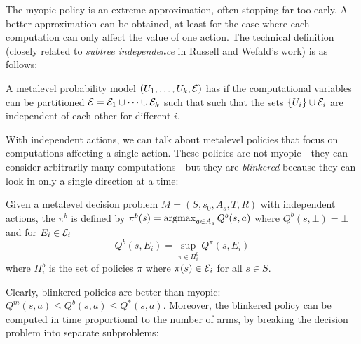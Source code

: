 


The myopic policy is an extreme approximation, often stopping far too early.
A better approximation can be obtained, at least for the case where
each computation can only affect the value of one action.
The technical definition (closely related to {\em subtree independence} in 
Russell and Wefald's work) is as follows:

\begin{dfn}\label{dfn:independent-actions}
	A metalevel probability model $(U_1,\dots,U_k,\mathcal{E})$ 
	has  if the computational variables can be partitioned 
	$\mathcal{E} = \mathcal{E}_1\cup\dots\cup\mathcal{E}_k$ such that such that
	the sets $\{U_i\}\cup\mathcal{E}_i$ are independent of each other for different $i$.	
\end{dfn}

With independent actions, we can talk about metalevel policies that focus on
computations affecting a single action. These policies are not myopic---they can consider arbitrarily many computations---but they are {\em blinkered} because they can look
in only a single direction at a time:

\begin{dfn}\label{dfn:blinkered}
	Given a metalevel decision problem $M=(S,s_0,A_s,T,R)$ with independent actions,
	the  $\pi^b$ is defined by $\pi^b(s) = \operatorname*{argmax}_{a\in A_s} Q^b(s,a)$ where
	$Q^b(s,\bot) = \bot$ and for $E_i\in\mathcal{E}_i$
	\begin{equation}\label{eq:blinkered}
		Q^b(s,E_i) = \sup_{\pi\in\Pi^b_i} Q^\pi(s,E_i)
	\end{equation}
	where $\Pi^b_i$ is the set of policies $\pi$ where $\pi(s)\in\mathcal{E}_i$ for all $s\in S$.
\end{dfn}

Clearly, blinkered policies are better than myopic: $Q^m(s,a) \le Q^b(s,a) \le Q^*(s,a)$.
Moreover, the blinkered policy can be computed in time proportional to the number of arms, by breaking the
decision problem into separate subproblems:

